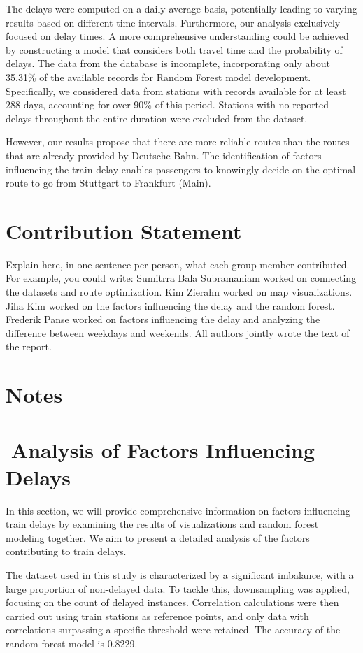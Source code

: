 \documentclass{article}
\theoremstyle{plain}
\theoremstyle{definition}
\theoremstyle{remark}
\begin{document}
The delays were computed on a daily average basis, potentially leading to varying results based on different time intervals. Furthermore, our analysis exclusively focused on delay times. A more comprehensive understanding could be achieved by constructing a model that considers both travel time and the probability of delays. The data from the database is incomplete, incorporating only about 35.31\% of the available records for Random Forest model development. Specifically, we considered data from stations with records available for at least 288 days, accounting for over 90\% of this period. Stations with no reported delays throughout the entire duration were excluded from the dataset.

However, our results propose that there are more reliable routes than the routes that are already provided by Deutsche Bahn. The identification of factors influencing the train delay enables passengers to knowingly decide on the optimal route to go from Stuttgart to Frankfurt (Main).


\section*{Contribution Statement}

Explain here, in one sentence per person, what each group member contributed. For example, you could write: Sumitrra Bala Subramaniam worked on connecting the datasets and route optimization. Kim Zierahn worked on map visualizations. Jiha Kim worked on the factors influencing the delay and the random forest. Frederik Panse worked on factors influencing the delay and analyzing the difference between weekdays and weekends. All authors jointly wrote the text of the report.

\section*{Notes}

\section{Analysis of Factors Influencing Delays}

In this section, we will provide comprehensive information on factors influencing train delays by examining the results of visualizations and random forest modeling together. We aim to present a detailed analysis of the factors contributing to train delays.

The dataset used in this study is characterized by a significant imbalance, with a large proportion of non-delayed data. To tackle this, downsampling was applied, focusing on the count of delayed instances. Correlation calculations were then carried out using train stations as reference points, and only data with correlations surpassing a specific threshold were retained. The accuracy of the random forest model is 0.8229.
\end{document}
